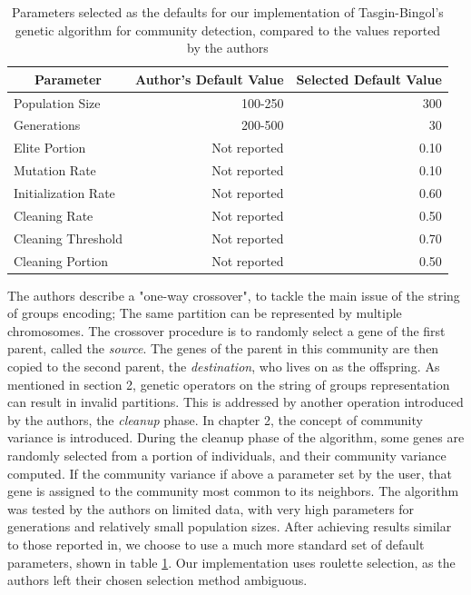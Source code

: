 \begin{table}[h!]
	\centering
	\begin{tabular}{|l | r| r|}
		\hline
		\multicolumn{1}{|c|}{\textbf{Parameter}} & \multicolumn{1}{|c|}{\textbf{Author's Default Value}}   & \multicolumn{1}{|c|}{\textbf{Selected Default Value}}\\
		\hline
		\hline
		Population Size & 100-250 & 300 \\
		\hline
		Generations & 200-500 & 30 \\
		\hline
		Elite Portion & Not reported & 0.10 \\
		\hline
		Mutation Rate & Not reported  & 0.10 \\
		\hline
		Initialization Rate & Not reported & 0.60 \\
		\hline
		Cleaning Rate & Not reported & 0.50 \\
		\hline
		Cleaning Threshold & Not reported & 0.70 \\
		\hline
		Cleaning Portion & Not reported & 0.50 \\ [0.2ex] 
		\hline
		
	\end{tabular}
	\caption{Parameters selected as the defaults for our implementation of Tasgin-Bingol's genetic algorithm for community detection, compared to the values reported by the authors}
	\label{table:tbgadef}
\end{table}
The authors describe a "one-way crossover", to tackle the main issue of the string of groups encoding; The same partition can be represented by multiple chromosomes. The crossover procedure is to randomly select a gene of the first parent, called the \textit{source}. The genes of the parent in this community are then copied to the second parent, the \textit{destination}, who lives on as the offspring. As mentioned in section 2, genetic operators on the string of groups representation can result in invalid partitions. This is addressed by another operation introduced by the authors, the \textit{cleanup} phase. In chapter 2, the concept of community variance is introduced. During the cleanup phase of the algorithm, some genes are randomly selected from a portion of individuals, and their community variance computed. If the community variance if above a parameter set by the user, that gene is assigned to the community most common to its neighbors.
The algorithm was tested by the authors on limited data, with very high parameters for generations and relatively small population sizes. After achieving results similar to those reported in\cite{Tasgin2006}, we choose to use a much more standard set of default parameters, shown in table \ref{table:tbgadef}. Our implementation uses roulette selection, as the authors left their chosen selection method ambiguous.

